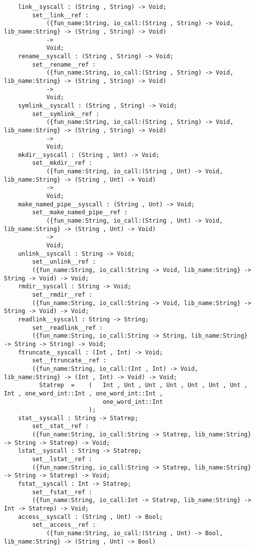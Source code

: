 \begin{verbatim}
    link__syscall : (String , String) -> Void;
        set__link__ref :
            ({fun_name:String, io_call:(String , String) -> Void, lib_name:String} -> (String , String) -> Void)
            ->
            Void;
    rename__syscall : (String , String) -> Void;
        set__rename__ref :
            ({fun_name:String, io_call:(String , String) -> Void, lib_name:String} -> (String , String) -> Void)
            ->
            Void;
    symlink__syscall : (String , String) -> Void;
        set__symlink__ref :
            ({fun_name:String, io_call:(String , String) -> Void, lib_name:String} -> (String , String) -> Void)
            ->
            Void;
    mkdir__syscall : (String , Unt) -> Void;
        set__mkdir__ref :
            ({fun_name:String, io_call:(String , Unt) -> Void, lib_name:String} -> (String , Unt) -> Void)
            ->
            Void;
    make_named_pipe__syscall : (String , Unt) -> Void;
        set__make_named_pipe__ref :
            ({fun_name:String, io_call:(String , Unt) -> Void, lib_name:String} -> (String , Unt) -> Void)
            ->
            Void;
    unlink__syscall : String -> Void;
        set__unlink__ref :
        ({fun_name:String, io_call:String -> Void, lib_name:String} -> String -> Void) -> Void;
    rmdir__syscall : String -> Void;
        set__rmdir__ref :
        ({fun_name:String, io_call:String -> Void, lib_name:String} -> String -> Void) -> Void;
    readlink__syscall : String -> String;
        set__readlink__ref :
        ({fun_name:String, io_call:String -> String, lib_name:String} -> String -> String) -> Void;
    ftruncate__syscall : (Int , Int) -> Void;
        set__ftruncate__ref :
        ({fun_name:String, io_call:(Int , Int) -> Void, lib_name:String} -> (Int , Int) -> Void) -> Void;
          Statrep  =    (   Int , Unt , Unt , Unt , Unt , Unt , Unt , Int , one_word_int::Int , one_word_int::Int ,
                            one_word_int::Int
                        );
    stat__syscall : String -> Statrep;
        set__stat__ref :
        ({fun_name:String, io_call:String -> Statrep, lib_name:String} -> String -> Statrep) -> Void;
    lstat__syscall : String -> Statrep;
        set__lstat__ref :
        ({fun_name:String, io_call:String -> Statrep, lib_name:String} -> String -> Statrep) -> Void;
    fstat__syscall : Int -> Statrep;
        set__fstat__ref :
        ({fun_name:String, io_call:Int -> Statrep, lib_name:String} -> Int -> Statrep) -> Void;
    access__syscall : (String , Unt) -> Bool;
        set__access__ref :
            ({fun_name:String, io_call:(String , Unt) -> Bool, lib_name:String} -> (String , Unt) -> Bool)

\end{verbatim}
